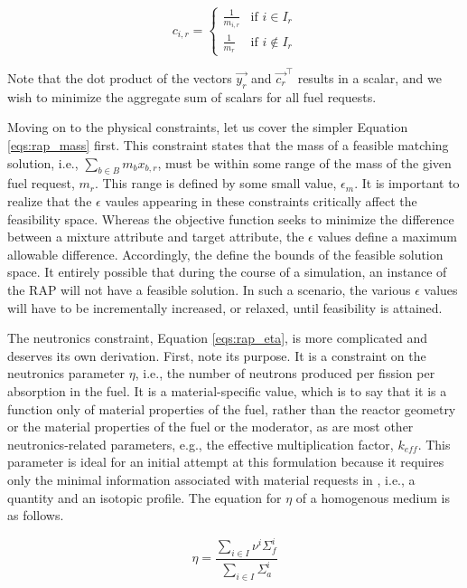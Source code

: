 \begin{equation}
c_{i,r} = 
\begin{cases}
 \frac{1}{m_{i,r}} & \text{if } i \in I_{r} \\
 \frac{1}{m_{r}}   & \text{if } i \not\in I_{r}
\end{cases}
\end{equation}

Note that the dot product of the vectors $\vec{y_{r}}$ and $\vec{c_{r}}^{\top}$
results in a scalar, and we wish to minimize the aggregate sum of scalars for
all fuel requests.

Moving on to the physical constraints, let us cover the simpler
Equation \ref{eqs:rap_mass} first. This constraint states that the mass of a
feasible matching solution, i.e., $\sum_{b \in B} m_{b} x_{b,r}$, must be within
some range of the mass of the given fuel request, $m_{r}$. This range is defined
by some small value, $\epsilon_{m}$. It is important to realize that the
$\epsilon$ vaules appearing in these constraints critically affect the
feasibility space. Whereas the objective function seeks to minimize the
difference between a mixture attribute and target attribute, the $\epsilon$
values define a maximum allowable difference. Accordingly, the define the bounds
of the feasible solution space. It entirely possible that during the course of a
simulation, an instance of the RAP will not have a feasible solution. In such a
scenario, the various $\epsilon$ values will have to be incrementally increased,
or relaxed, until feasibility is attained.

The neutronics constraint, Equation \ref{eqs:rap_eta}, is more complicated and
deserves its own derivation. First, note its purpose. It is a constraint on the
neutronics parameter $\eta$, i.e., the number of neutrons produced per fission
per absorption in the fuel. It is a material-specific value, which is to say
that it is a function only of material properties of the fuel, rather than the
reactor geometry or the material properties of the fuel or the moderator, as are
most other neutronics-related parameters, e.g., the effective multiplication
factor, $k_{eff}$. This parameter is ideal for an initial attempt at this
formulation because it requires only the minimal information associated with
material requests in \Cyclus, i.e., a quantity and an isotopic profile. The
equation for $\eta$ of a homogenous medium is as follows.

\begin{equation}
\label{eqs:eta_macro}
\eta = \frac{\sum_{i \in I} \nu^{i} \Sigma_{f}^{i}}
            {\sum_{i \in I} \Sigma_{a}^{i}}
\end{equation}

